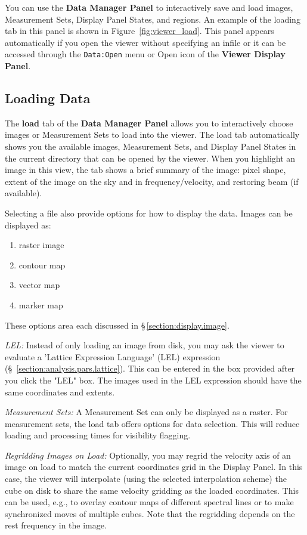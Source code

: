 You can use the {\bf Data Manager Panel} to interactively save  and load
images, Measurement Sets, Display Panel States, and regions. An 
example of the loading tab in this panel is shown in Figure~\ref{fig:viewer_load}.  This
panel appears automatically if you open the viewer without specifying
an infile or it can be accessed through the {\tt Data:Open} menu or Open icon
of the {\bf Viewer Display Panel}.

\subsection{Loading Data}
\label{section:display.dataManager.load}

The {\bf load} tab of the {\bf Data Manager Panel} allows you to interactively
choose images or Measurement Sets to load into the viewer. The load tab
automatically shows you the available images, Measurement Sets, and
Display Panel States in the current directory that can be opened by the viewer.
When you highlight an image in this view, the tab shows a brief summary of
the image: pixel shape, extent of the image on the sky and in frequency/velocity, and 
restoring beam (if available).

Selecting a file also provide options for how to display the data. Images can be displayed as: 

\begin{enumerate}
\item raster image 
\item contour map 
\item vector map
\item marker map  
\end{enumerate}

These options area each discussed in \S\,\ref{section:display.image}.

{\em LEL:} Instead of only loading an image from disk, you may ask the
viewer to evaluate a 'Lattice Expression Language' (LEL) expression (\S~\ref{section:analysis.pars.lattice}). This can
be entered in the box provided after you click the "LEL" box. The images used in the
LEL expression should have the same coordinates and extents. 

{\em Measurement Sets:} A Measurement Set can only be displayed as a raster. For 
measurement sets, the load tab offers options for data selection. This will reduce 
loading and processing times for visibility flagging.  

{\em Regridding Images on Load:} Optionally, you may regrid the velocity axis of an image 
on load to match the current coordinates grid in the Display Panel. In this case, the viewer
will interpolate (using the selected interpolation scheme) the cube on disk to share the 
same velocity gridding as the loaded coordinates. This can be used, e.g., to overlay contour
maps of different spectral lines or to make synchronized moves of multiple cubes. Note that
the regridding depends on the rest frequency in the image. 

